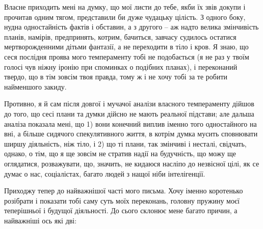 Власне приходить мені на думку, що мої листи до тебе, якби їх звів докупи і
прочитав одним тягом, представили би дуже чудацьку цілість. З одного боку,
нудна одностайність фактів і обставин, а з другого – аж надто велика
змінчивість планів, намірів, предпринять, котрим, бачиться, завчасу судилось
остатися мертворожденними дітьми фантазії, а не переходити в тіло і кров. Я
знаю, що сеся послідня проява мого темпераменту тобі не подобається (я не раз у
твоїм голосі чув ніжну іронію при споминках о подібних планах), і переконаний
твердо, що в тім зовсім твоя правда, тому ж і не хочу тобі за те робити
найменшого закиду.

Противно, я й сам після довгої і мучачої аналізи власного темпераменту дійшов
до того, що сесі плани та думки дійсно не мають реальної підстави; але дальша
аналіза показала мені, що 1) вони конечний виплив іменно того одностайного на
вні, а більше сидячого спекулятивного життя, в котрім думка мусить сповнювати
ширшу діяльність, ніж тіло, і 2) що ті плани, так змінчиві і несталі, свідчать,
однако, о тім, що я ще зовсім не стратив надії на будучність, що можу ще
оглядатися, розважувати, що, значить, не кидаюся насліпо до незвісної цілі, як
се думає о нас, соціалістах, багато людей з нащої ніби інтелігенції.

Приходжу тепер до найважнішої часті мого письма. Хочу іменно коротенько розібрати і показати тобі саму суть моїх переконань, головну пружину моєї теперішньої і будущої діяльності. До сього склонює мене багато причин, а найважніші ось які дві:

